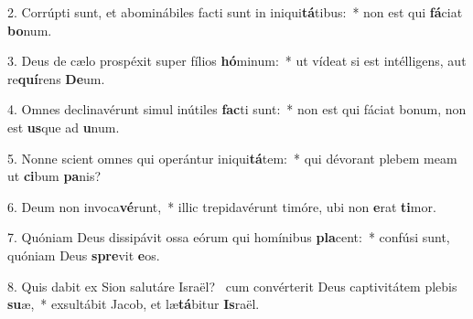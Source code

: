2. Corrúpti sunt, et abominábiles facti sunt in iniqui\textbf{tá}tibus:~*  non est qui \textbf{fá}ciat \textbf{bo}num.\

3. Deus de cælo prospéxit super fílios \textbf{hó}minum:~*  ut vídeat si est intélligens, aut re\textbf{quí}rens \textbf{De}um.\

4. Omnes declinavérunt simul inútiles \textbf{fac}ti sunt:~*  non est qui fáciat bonum, non est \textbf{us}que ad \textbf{u}num.\

5. Nonne scient omnes qui operántur iniqui\textbf{tá}tem:~*  qui dévorant plebem meam ut \textbf{ci}bum \textbf{pa}nis?\

6. Deum non invoca\textbf{vé}runt,~*  illic trepidavérunt timóre, ubi non \textbf{e}rat \textbf{ti}mor.\

7. Quóniam Deus dissipávit ossa eórum qui homínibus \textbf{pla}cent:~*  confúsi sunt, quóniam Deus \textbf{spre}vit \textbf{e}os.\

8. Quis dabit ex Sion salutáre Israël? \dag\  cum convérterit Deus captivitátem plebis \textbf{su}æ,~*  exsultábit Jacob, et læ\textbf{tá}bitur \textbf{Is}raël.\

